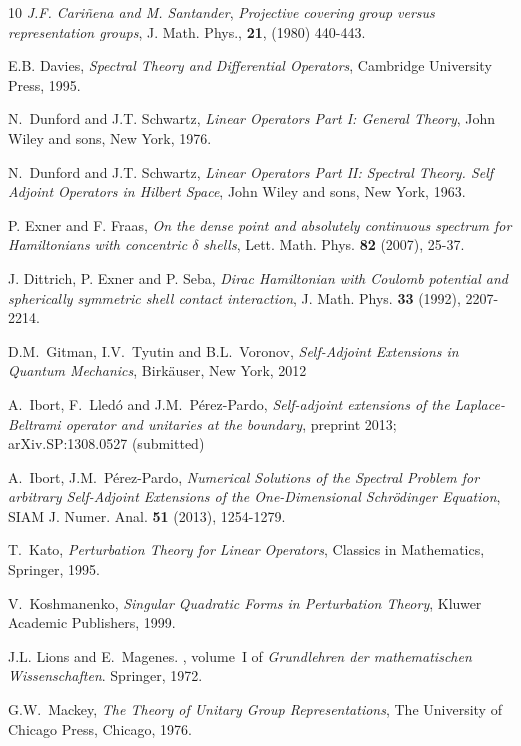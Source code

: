 \documentclass[a4paper,12pt]{amsart}
\newcommand{\1}{\mathbb{I}}
\numberwithin{equation}{section}
\numberwithin{theorem}{section}
\begin{document}
\begin{thebibliography}{10}
{\em J.F. Cari\~nena and M. Santander}, {\em Projective covering group versus representation groups}, 
J. Math. Phys., {\bf 21}, (1980) 440-443.

{\sc E.B. Davies}, {\em Spectral Theory and Differential Operators}, Cambridge
 University Press, 1995.

{\sc N.~Dunford and J.T. Schwartz}, {\em Linear Operators Part I: General Theory},
John Wiley and sons, New York, 1976.

{\sc N.~Dunford and J.T. Schwartz}, {\em Linear Operators Part II: Spectral Theory. Self Adjoint Operators in Hilbert Space},
John Wiley and sons, New York, 1963.
  
  {\sc P. Exner and F. Fraas},
{\em On the dense point and absolutely continuous spectrum for Hamiltonians with concentric $\delta$ shells},
Lett. Math. Phys. {\bf 82} (2007), 25-37.

  {\sc J. Dittrich, P. Exner and P. Seba}, 
{\em Dirac Hamiltonian with Coulomb potential and spherically symmetric shell contact interaction},  
J. Math. Phys. {\bf 33} (1992), 2207-2214.

{\sc D.M.~Gitman, I.V.~Tyutin and B.L.~Voronov},
{\em Self-Adjoint Extensions in Quantum Mechanics},
Birk\"auser, New York, 2012

{\sc A.~Ibort, F.~Lled\'o and J.M.~P\'erez-Pardo},
{\em Self-adjoint extensions of the Laplace-Beltrami operator and unitaries at the boundary},
preprint 2013; arXiv.SP:1308.0527 (submitted)

{\sc A.~Ibort, J.M.~P\'erez-Pardo}, \emph{Numerical Solutions of the Spectral 
Problem for arbitrary Self-Adjoint Extensions of the One-Dimensional Schr\"odinger Equation}, 
SIAM J. Numer. Anal. \textbf{51} (2013), 1254-1279. 

{\sc T.~Kato}, {\em Perturbation Theory for Linear Operators}, Classics in
  Mathematics, Springer, 1995.

{\sc V.~Koshmanenko}, {\em Singular Quadratic Forms in Perturbation Theory},
  Kluwer Academic Publishers, 1999.

{\sc J.L. Lions and E.~Magenes}.
,
  volume~I of {\em Grundlehren der mathematischen Wissenschaften}.
\newblock Springer, 1972.

{\sc G.W.~Mackey},
{\em The Theory of Unitary Group Representations},
The University of Chicago Press, Chicago, 1976.


\end{thebibliography}
\end{document}
